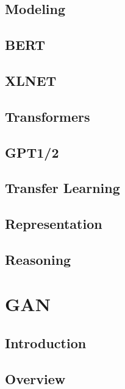 \documentclass[11pt,fleqn]{book} %
\begin{document}
\chapter{Modeling}
\chapter{BERT}
\chapter{XLNET}
\chapter{Transformers}
\chapter{GPT1/2}
\chapter{Transfer Learning}
\chapter{Representation}
\chapter{Reasoning}


\part{GAN}


\chapter{Introduction}
\chapter{Overview}
\end{document}
